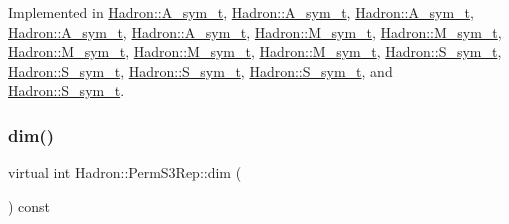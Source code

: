 Implemented in \mbox{\hyperlink{structHadron_1_1A__sym__t_a57e9460ee09050859f969d1f0cae0e92}{Hadron\+::\+A\+\_\+sym\+\_\+t}}, \mbox{\hyperlink{structHadron_1_1A__sym__t_a57e9460ee09050859f969d1f0cae0e92}{Hadron\+::\+A\+\_\+sym\+\_\+t}}, \mbox{\hyperlink{structHadron_1_1A__sym__t_a57e9460ee09050859f969d1f0cae0e92}{Hadron\+::\+A\+\_\+sym\+\_\+t}}, \mbox{\hyperlink{structHadron_1_1A__sym__t_a57e9460ee09050859f969d1f0cae0e92}{Hadron\+::\+A\+\_\+sym\+\_\+t}}, \mbox{\hyperlink{structHadron_1_1A__sym__t_a57e9460ee09050859f969d1f0cae0e92}{Hadron\+::\+A\+\_\+sym\+\_\+t}}, \mbox{\hyperlink{structHadron_1_1M__sym__t_a9ee8ba6fd6c2220231052690b2995ed5}{Hadron\+::\+M\+\_\+sym\+\_\+t}}, \mbox{\hyperlink{structHadron_1_1M__sym__t_a9ee8ba6fd6c2220231052690b2995ed5}{Hadron\+::\+M\+\_\+sym\+\_\+t}}, \mbox{\hyperlink{structHadron_1_1M__sym__t_a9ee8ba6fd6c2220231052690b2995ed5}{Hadron\+::\+M\+\_\+sym\+\_\+t}}, \mbox{\hyperlink{structHadron_1_1M__sym__t_a9ee8ba6fd6c2220231052690b2995ed5}{Hadron\+::\+M\+\_\+sym\+\_\+t}}, \mbox{\hyperlink{structHadron_1_1M__sym__t_a9ee8ba6fd6c2220231052690b2995ed5}{Hadron\+::\+M\+\_\+sym\+\_\+t}}, \mbox{\hyperlink{structHadron_1_1S__sym__t_ae8b1558dc91f46f5d78de03f1e587dc0}{Hadron\+::\+S\+\_\+sym\+\_\+t}}, \mbox{\hyperlink{structHadron_1_1S__sym__t_ae8b1558dc91f46f5d78de03f1e587dc0}{Hadron\+::\+S\+\_\+sym\+\_\+t}}, \mbox{\hyperlink{structHadron_1_1S__sym__t_ae8b1558dc91f46f5d78de03f1e587dc0}{Hadron\+::\+S\+\_\+sym\+\_\+t}}, \mbox{\hyperlink{structHadron_1_1S__sym__t_ae8b1558dc91f46f5d78de03f1e587dc0}{Hadron\+::\+S\+\_\+sym\+\_\+t}}, and \mbox{\hyperlink{structHadron_1_1S__sym__t_ae8b1558dc91f46f5d78de03f1e587dc0}{Hadron\+::\+S\+\_\+sym\+\_\+t}}.

\mbox{\label{structHadron_1_1PermS3Rep_a4ce8c9c9367b6120769feae38d2f5372}} 
\subsubsection{\texorpdfstring{dim()}{dim()}\hspace{0.1cm}{\footnotesize\ttfamily [3/3]}}
{\footnotesize\ttfamily virtual int Hadron\+::\+Perm\+S3\+Rep\+::dim (\begin{DoxyParamCaption}{ }\end{DoxyParamCaption}) const\hspace{0.3cm}{\ttfamily [pure virtual]}}



